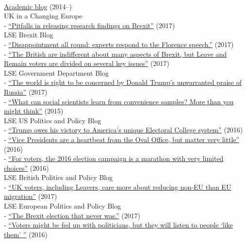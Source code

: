 \documentclass[12pt]{article}
\newcommand{\topic}[1]{\pagebreak[3]\indent {\color{lg}{\footnotesize #1 }}\\}
\newcommand{\entry}[1]{\indent {\color{lg}\guillemotright}\hspace{2pt}#1\vspace{.25em}\\}
\newcommand{\subentry}[1]{{\color{lg}-} #1\vspace{.25em}\\}
\begin{document}
	\topic{Occasional Blogging}
		\entry{\href{http://thomasleeper.com/blog}{Academic blog} (2014--)}
		\entry{UK in a Changing Europe}
			\subentry{\href{http://ukandeu.ac.uk/pitfalls-in-releasing-research-findings-on-brexit/}{``Pitfalls in releasing research findings on Brexit''} (2017)}
		\entry{LSE Brexit Blog}
			\subentry{\href{http://blogs.lse.ac.uk/brexit/2017/09/22/disappointment-all-round-experts-respond-to-the-florence-speech/}{``Disappointment all round: experts respond to the Florence speech.''} (2017)}
            \subentry{\href{http://blogs.lse.ac.uk/brexit/2017/08/13/the-british-are-indifferent-about-many-aspects-of-brexit-but-leave-and-remain-voters-are-divided-on-several-key-issues/}{``The British are indifferent about many aspects of Brexit, but Leave and Remain voters are divided on several key issues''} (2017)}
		\entry{LSE Government Department Blog}
			\subentry{\href{http://blogs.lse.ac.uk/government/2017/01/09/the-world-is-right-to-be-concerned-by-donald-trumps-unwarranted-praise-of-russia/}{``The world is right to be concerned by Donald Trump's unwarranted praise of Russia''} (2017)}
			\subentry{\href{http://blogs.lse.ac.uk/government/2016/01/14/what-can-social-scientists-learn-from-convenience-samples-more-than-you-might-think/}{``What can social scientists learn from convenience samples? More than you might think''} (2015)}
		\entry{LSE US Politics and Policy Blog}
			\subentry{\href{http://blogs.lse.ac.uk/usappblog/2016/11/10/trump-owes-his-victory-to-americas-unique-electoral-college-system/}{``Trump owes his victory to America's unique Electoral College system''} (2016)}
			\subentry{\href{http://blogs.lse.ac.uk/usappblog/2016/10/05/vice-presidents-are-a-heartbeat-from-the-oval-office-but-matter-very-little/}{``Vice Presidents are a heartbeat from the Oval Office, but matter very little''} (2016)}
			\subentry{\href{http://blogs.lse.ac.uk/usappblog/2016/09/23/for-voters-the-2016-election-campaign-is-a-marathon-with-very-limited-choices/}{``For voters, the 2016 election campaign is a marathon with very limited choices''} (2016)}
		\entry{LSE British Politics and Policy Blog}
			\subentry{\href{http://blogs.lse.ac.uk/politicsandpolicy/non-eu-migration-is-what-uk-voters-care-most-about/}{``UK voters, including Leavers, care more about reducing non-EU than EU migration''} (2017)}
        \entry{LSE European Politics and Policy Blog}
			\subentry{\href{http://blogs.lse.ac.uk/europpblog/2017/06/07/uk-general-election-preview-what-to-look-out-for-as-britain-goes-to-the-polls/}{``The Brexit election that never was.''} (2017)}
            \subentry{\href{http://blogs.lse.ac.uk/europpblog/2016/06/23/voters-listen-people-like-them/}{``Voters might be fed up with politicians, but they will listen to people `like them' ''} (2016)}
\end{document}
